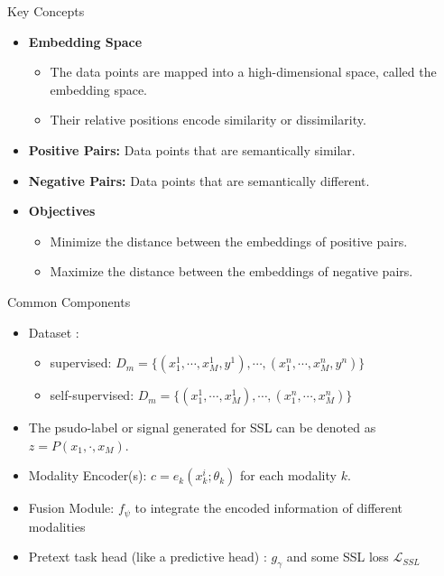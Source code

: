 \documentclass[serif, aspectratio=169]{beamer}
\begin{document}
\begin{frame}{Key Concepts}
    \begin{itemize}
        \item \textbf{Embedding Space}
        \begin{itemize}
            \item The data points are mapped into a high-dimensional space, called the embedding space.
            \item Their relative positions encode similarity or dissimilarity.
        \end{itemize}
        
        \item \textbf{Positive Pairs:} Data points that are semantically similar.
        \item \textbf{Negative Pairs:} Data points that are semantically different.

        \item \textbf{Objectives}
        \begin{itemize}
            \item Minimize the distance between the embeddings of positive pairs.
            \item Maximize the distance between the embeddings of negative pairs.
        \end{itemize}
    \end{itemize}
\end{frame}


\begin{frame}{Common Components}
    \begin{itemize}
        \item Dataset :
\begin{itemize}
\item supervised:  $D_m = \{ (x_1^1, \cdots, x_M^1, y^1), \cdots, (x_1^n, \cdots, x_M^n, y^n)  \}$
\item self-supervised:  $D_m = \{ (x_1^1, \cdots, x_M^1), \cdots, (x_1^n, \cdots, x_M^n)  \}$
\end{itemize}
\item The psudo-label or signal generated for SSL can be denoted as $z = P(x_1,\cdot,x_M)$.

        \item Modality Encoder(s): $c = e_k(x_k^i; \theta_k)$ for each modality $k$.
	\item Fusion Module: $f_\psi$ to integrate the encoded information of different modalities
	\item Pretext task head (like a predictive head) : $g_\gamma$ and some SSL loss $\mathcal{L}_{SSL}$

    \end{itemize}
\end{frame}
\end{document}

